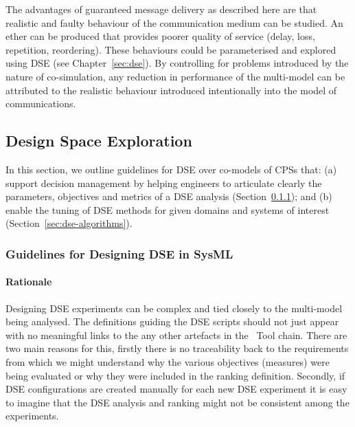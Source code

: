 The advantages of guaranteed message delivery as described here are that realistic and faulty behaviour of the communication medium can be studied. An ether can be produced that provides poorer quality of service (delay, loss, repetition, reordering). These behaviours could be parameterised and explored using DSE (see Chapter~\ref{sec:dse}). By controlling for problems introduced by the nature of co-simulation, any reduction in performance of the multi-model can be attributed to the realistic behaviour introduced intentionally into the model of communications.


\subsection{Design Space Exploration}
\label{sec:method:dse}

In this section, we outline guidelines for  DSE over co-models of CPSs that: (a) support decision management by helping engineers to articulate clearly the parameters, objectives and metrics of a DSE analysis (Section~\ref{sec:dse-sysml}); and (b) enable the tuning of DSE methods for given domains and systems of interest (Section~\ref{sec:dse-algorithms}).
%
%
%
%
%

%
%
%


\subsubsection{Guidelines for Designing DSE in SysML}
\label{sec:dse-sysml}
\label{sec:dse-linefollow}

\paragraph{Rationale}

Designing DSE experiments can be complex and tied closely to the multi-model being analysed. The definitions guiding the DSE scripts should not just appear with no meaningful links to the any other artefacts in the \into\ Tool  chain. There are two main reasons for this, firstly there is no traceability back to the requirements from which we might understand why the various objectives (measures) were being evaluated or why they were included in the ranking definition.  Secondly, if DSE configurations are created manually for each new DSE experiment it is easy to imagine that the DSE analysis and ranking might not be consistent among the experiments.

